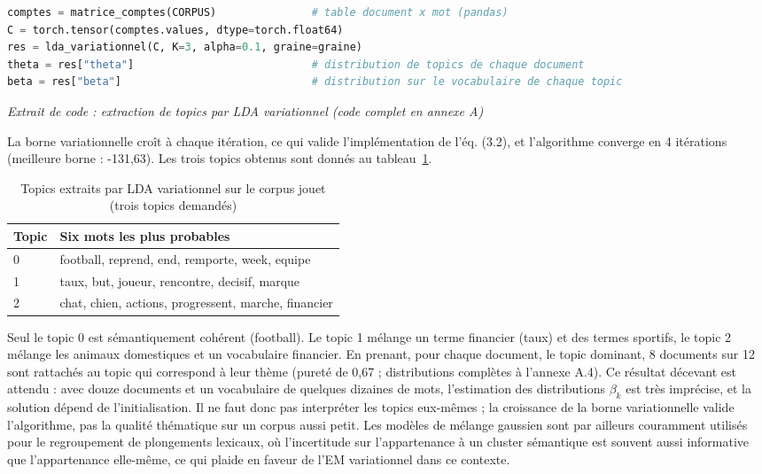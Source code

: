 \begin{lstlisting}[language=Python]
comptes = matrice_comptes(CORPUS)               # table document x mot (pandas)
C = torch.tensor(comptes.values, dtype=torch.float64)
res = lda_variationnel(C, K=3, alpha=0.1, graine=graine)
theta = res["theta"]                            # distribution de topics de chaque document
beta = res["beta"]                              # distribution sur le vocabulaire de chaque topic
\end{lstlisting}
\begin{center}\small\emph{Extrait de code : extraction de topics par LDA variationnel (code complet en annexe A)}\end{center}
La borne variationnelle croît à chaque itération, ce qui valide l'implémentation de l'éq. (3.2), et l'algorithme converge en 4 itérations (meilleure borne : -131,63). Les trois topics obtenus sont donnés au tableau~\ref{tab:3_1b}.

\begin{table}[H]
\centering
\small
\setlength{\tabcolsep}{0.14cm}
\begin{tabular}{|p{2.5cm}|p{12.3cm}|}
\hline
\textbf{Topic} & \textbf{Six mots les plus probables} \\
\hline
0 & football, reprend, end, remporte, week, equipe \\
\hline
1 & taux, but, joueur, rencontre, decisif, marque \\
\hline
2 & chat, chien, actions, progressent, marche, financier \\
\hline
\end{tabular}
\caption{Topics extraits par LDA variationnel sur le corpus jouet (trois topics demandés)}
\label{tab:3_1b}
\end{table}
Seul le topic 0 est sémantiquement cohérent (football). Le topic 1 mélange un terme financier (taux) et des termes sportifs, le topic 2 mélange les animaux domestiques et un vocabulaire financier. En prenant, pour chaque document, le topic dominant, 8 documents sur 12 sont rattachés au topic qui correspond à leur thème (pureté de 0,67 ; distributions complètes à l'annexe A.4). Ce résultat décevant est attendu : avec douze documents et un vocabulaire de quelques dizaines de mots, l'estimation des distributions $\beta _{k}$ est très imprécise, et la solution dépend de l'initialisation. Il ne faut donc pas interpréter les topics eux-mêmes ; la croissance de la borne variationnelle valide l'algorithme, pas la qualité thématique sur un corpus aussi petit. Les modèles de mélange gaussien sont par ailleurs couramment utilisés pour le regroupement de plongements lexicaux, où l'incertitude sur l'appartenance à un cluster sémantique est souvent aussi informative que l'appartenance elle-même, ce qui plaide en faveur de l'EM variationnel dans ce contexte.

